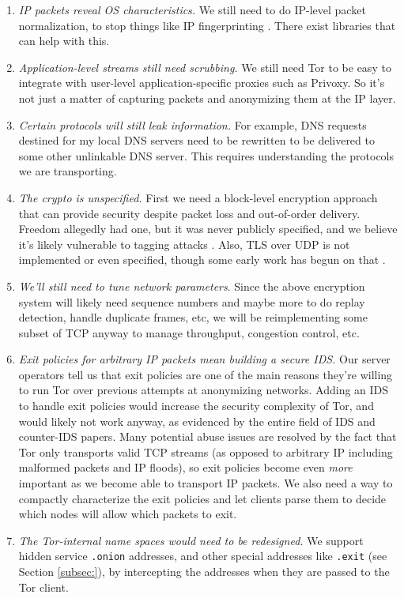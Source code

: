 \documentclass{llncs}
\begin{document}
\begin{enumerate}
\setlength{\itemsep}{0mm}
\setlength{\parsep}{0mm}
\item \emph{IP packets reveal OS characteristics.} We still need to do
IP-level packet normalization, to stop things like IP fingerprinting
\cite{ip-fingerprinting}. There exist libraries \cite{ip-normalizing}
that can help with this.
\item \emph{Application-level streams still need scrubbing.} We still need
Tor to be easy to integrate with user-level application-specific proxies
such as Privoxy. So it's not just a matter of capturing packets and
anonymizing them at the IP layer.
\item \emph{Certain protocols will still leak information.} For example,
DNS requests destined for my local DNS servers need to be rewritten
to be delivered to some other unlinkable DNS server. This requires
understanding the protocols we are transporting.
\item \emph{The crypto is unspecified.} First we need a block-level encryption
approach that can provide security despite
packet loss and out-of-order delivery. Freedom allegedly had one, but it was
never publicly specified, and we believe it's likely vulnerable to tagging
attacks \cite{tor-design}. Also, TLS over UDP is not implemented or even
specified, though some early work has begun on that \cite{ben-tls-udp}.
\item \emph{We'll still need to tune network parameters}. Since the above
encryption system will likely need sequence numbers and maybe more to do
replay detection, handle duplicate frames, etc, we will be reimplementing
some subset of TCP anyway to manage throughput, congestion control, etc.
\item \emph{Exit policies for arbitrary IP packets mean building a secure
IDS.}  Our server operators tell us that exit policies are one of
the main reasons they're willing to run Tor over previous attempts
at anonymizing networks.  Adding an IDS to handle exit policies would
increase the security complexity of Tor, and would likely not work anyway,
as evidenced by the entire field of IDS and counter-IDS papers. Many
potential abuse issues are resolved by the fact that Tor only transports
valid TCP streams (as opposed to arbitrary IP including malformed packets
and IP floods), so exit policies become even \emph{more} important as
we become able to transport IP packets. We also need a way to compactly
characterize the exit policies and let clients parse them to decide
which nodes will allow which packets to exit.
\item \emph{The Tor-internal name spaces would need to be redesigned.} We
support hidden service {\tt{.onion}} addresses, and other special addresses
like {\tt{.exit}} (see Section \ref{subsec:}), by intercepting the addresses
when they are passed to the Tor client.
\end{enumerate}
\end{document}
